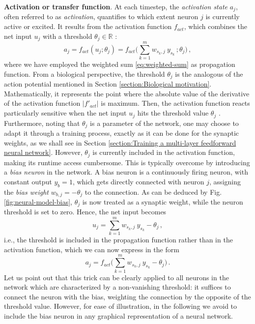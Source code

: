 \documentclass[12pt, a4paper, twoside, openright, notitlepage]{report}
\numberwithin{equation}{chapter}
\theoremstyle{theorem}
\theoremstyle{definition}
\theoremstyle{remark}
\theoremstyle{proposition}
\numberwithin{figure}{chapter}
\begin{document}
		\noindent \textbf{Activation or transfer function}. At each timestep, the \emph{activation state} $a_j$, often referred to as \emph{activation}, quantifies to which extent neuron $j$ is currently active or excited. It results from the activation function $f_{act}$, which combines the net input $u_j$ with a threshold $\theta_j \in \mathbb{R}$ \cite{Kri07}: 
		\begin{equation*}
			\label{eq:activation-function}
			a_j = f_{act}(u_j; \theta_j) = f_{act} \big( \sum_{k = 1}^m w_{s_k,j} ~ y_{s_k} \, ; \theta_j \big) \, ,
		\end{equation*}
		where we have employed the weighted sum \eqref{eq:weighted-sum} as propagation function. From a biological perspective, the threshold $\theta_j$ is the analogous of the action potential mentioned in Section \ref{section:Biological motivation}. Mathematically, it represents the point where the absolute value of the derivative of the activation function $|f'_{act}|$ is maximum. Then, the activation function reacts particularly sensitive when the net input $u_j$ hits the threshold value $\theta_j$ \cite{Kri07}. \\
		Furthermore, noting that $\theta_j$ is a parameter of the network, one may choose to adapt it through a training process, exactly as it can be done for the synaptic weights, as we shall see in Section \ref{section:Training a multi-layer feedforward neural network}. However, $\theta_j$ is currently included in the activation function, making its runtime access cumbersome. This is typically overcome by introducing a \emph{bias neuron} in the network. A bias neuron is a continuously firing neuron, with constant output $y_{b} = 1$, which gets directly connected with neuron $j$, assigning the \emph{bias weight} $w_{b,j} = - \theta_j$ to the connection. As can be deduced by Fig. \ref{fig:neural-model-bias}, $\theta_j$ is now treated as a synaptic weight, while the neuron threshold is set to zero. Hence, the net input becomes
		\begin{equation}
			\label{eq:net-input}
			u_j = \sum_{k = 1}^m w_{s_k,j} ~ y_{s_k} - \theta_j \, ,
		\end{equation}
		i.e., the threshold is included in the propagation function rather than in the activation function, which we can now express in the form
		\begin{equation*}
			a_j = f_{act} \big( \sum_{k = 1}^m w_{s_k,j} ~ y_{s_k} - \theta_j \big) \, .
		\end{equation*}
		Let us point out that this trick can be clearly applied to all neurons in the network which are characterized by a non-vanishing threshold: it suffices to connect the neuron with the bias, weighting the connection by the opposite of the threshold value. However, for ease of illustration, in the following we avoid to include the bias neuron in any graphical representation of a neural network.
		
\end{document}
